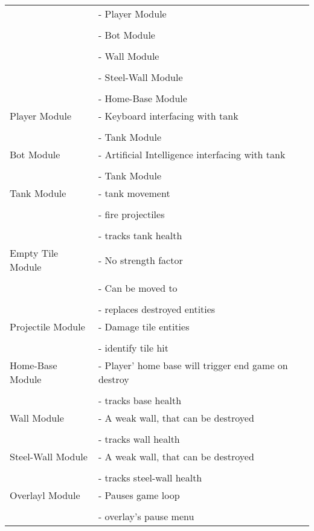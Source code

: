 \documentclass{article}
\begin{document}
\begin{tabularx}{\textwidth}{l X}
	 & - Player Module\\ \\
	 & - Bot Module\\ \\
	 & - Wall Module\\ \\
	 & - Steel-Wall Module\\ \\
	 & - Home-Base Module\\
	  \midrule
	 Player Module & - Keyboard interfacing with tank\\ \\
	 & - Tank Module\\
	   \midrule
	 Bot Module & - Artificial Intelligence interfacing  with tank\\ \\
	 & - Tank Module\\
	 \midrule
	 Tank Module & - tank movement \\ \\
	 & - fire projectiles\\ \\
	 & - tracks tank health\\
	   \midrule
	 Empty Tile Module & - No strength factor \\ \\
	  & - Can be moved to\\ \\
	  & - replaces destroyed entities\\
	    \midrule
	 Projectile Module & - Damage tile entities \\ \\
	 & - identify tile hit\\
	  \midrule
	 Home-Base Module & - Player' home base will trigger end game on destroy \\ \\
	 & - tracks base health\\
	 \midrule 
	 Wall Module & - A weak wall, that can be destroyed \\ \\
	 & - tracks wall health\\
	 \midrule
	 Steel-Wall Module & - A weak wall, that can be destroyed \\ \\
	 & - tracks steel-wall health\\
	  \midrule
	 Overlayl Module & - Pauses game loop \\ \\
	 & - overlay's pause menu
\end{tabularx}
\end{document}
